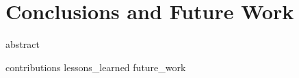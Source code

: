 \chapter{Conclusions and Future Work}
\label{chapter:conclusions}
\glsresetall


{abstract}



\clearpage
{contributions}
{lessons_learned}
{future_work}


